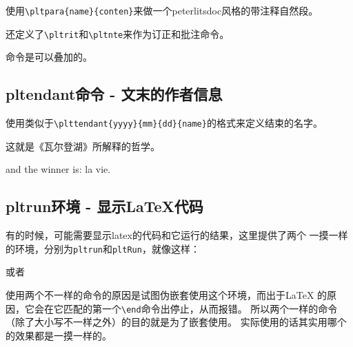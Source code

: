 \documentclass{peterlitsdoc}
\newcommand{\vb}{\verb}
\begin{document}
使用\vb|\pltpara{name}{conten}|来做一个peterlitsdoc风格的带注释自然段。
\begin{pltrun}
\end{pltrun}

还定义了\vb|\pltrit|和\verb|\pltnte|来作为订正和批注命令。
\begin{pltrun}
\end{pltrun}

命令是可以叠加的。
\begin{pltrun}
\end{pltrun}


\subsection{pltendant命令 - 文末的作者信息}

使用类似于\vb|\plttendant{yyyy}{mm}{dd}{name}|的格式来定义结束的名字。
\begin{pltrun}
这就是《瓦尔登湖》所解释的哲学。

and the winner is: la vie.

\end{pltrun}


\subsection{pltrun环境 - 显示\LaTeX{}代码}

有的时候，可能需要显示latex的代码和它运行的结果，这里提供了两个
一摸一样的环境，分别为\vb|pltrun|和\verb|pltRun|，就像这样：
\begin{pltRun}
\begin{pltrun}
\end{pltrun}
\end{pltRun}
或者
\begin{pltrun}
\begin{pltRun}
\end{pltRun}
\end{pltrun}

使用两个不一样的命令的原因是试图伪嵌套使用这个环境，而出于\LaTeX
的原因，它会在它匹配的第一个\vb|\end|命令出停止，从而报错。
所以两个一样的命令（除了大小写不一样之外）的目的就是为了嵌套使用。
实际使用的话其实用哪个的效果都是一摸一样的。
\end{document}

